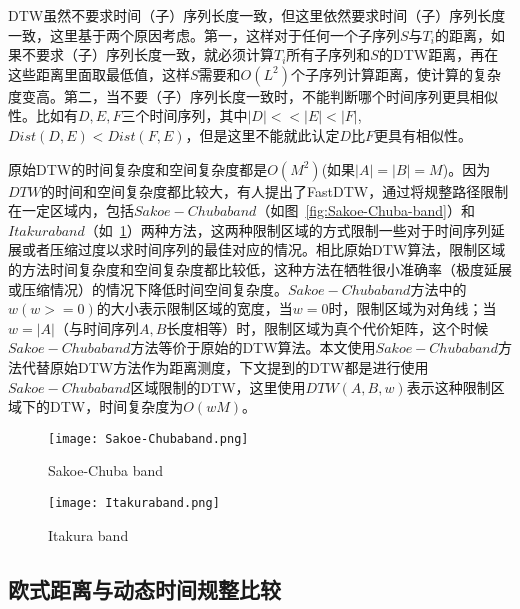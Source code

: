 DTW虽然不要求时间（子）序列长度一致，但这里依然要求时间（子）序列长度一致，这里基于两个原因考虑。第一，这样对于任何一个子序列$S$与$T_i$的距离，如果不要求（子）序列长度一致，就必须计算$T_i$所有子序列和$S$的DTW距离，再在这些距离里面取最低值，这样$S$需要和$O(L^2)$个子序列计算距离，使计算的复杂度变高。第二，当不要（子）序列长度一致时，不能判断哪个时间序列更具相似性。比如有$D,E,F$三个时间序列，其中$|D|<<|E|<|F|$,$Dist(D,E) < Dist(F,E)$，但是这里不能就此认定$D$比$F$更具有相似性。

原始DTW的时间复杂度和空间复杂度都是$O(M^2)$(如果$|A|=|B|=M$)。因为$DTW$的时间和空间复杂度都比较大，有人提出了FastDTW\cite{salvador2007toward}，通过将规整路径限制在一定区域内，包括$Sakoe-Chuba band$（如图~\ref{fig:Sakoe-Chuba-band}）和$Itakura band$（如~\ref{fig:Itakura-band}）两种方法，这两种限制区域的方式限制一些对于时间序列延展或者压缩过度以求时间序列的最佳对应的情况。相比原始DTW算法，限制区域的方法时间复杂度和空间复杂度都比较低，这种方法在牺牲很小准确率（极度延展或压缩情况）的情况下降低时间空间复杂度。$Sakoe-Chuba band$方法中的$w(w>=0)$的大小表示限制区域的宽度，当$w=0$时，限制区域为对角线；当$w=|A|$（与时间序列$A,B$长度相等）时，限制区域为真个代价矩阵，这个时候$Sakoe-Chuba band$方法等价于原始的DTW算法。本文使用$Sakoe-Chuba band$方法代替原始DTW方法作为距离测度，下文提到的DTW都是进行使用$Sakoe-Chuba band$区域限制的DTW，这里使用$DTW(A,B,w)$表示这种限制区域下的DTW，时间复杂度为$O(wM)$。
\begin{figure}
	\begin{minipage}{0.48\textwidth}
		\centering
		\texttt{[image: Sakoe-Chubaband.png]}
		\caption{Sakoe-Chuba band}
		\label{fig:Sakoe-Chuba-band}
	\end{minipage}\hfill
	\begin{minipage}{0.48\textwidth}
		\centering
		\texttt{[image: Itakuraband.png]}
		\caption{Itakura band}
		\label{fig:Itakura-band}
	\end{minipage}
\end{figure}

\subsection{欧式距离与动态时间规整比较}
\label{chap02:euclid2Dtw}


